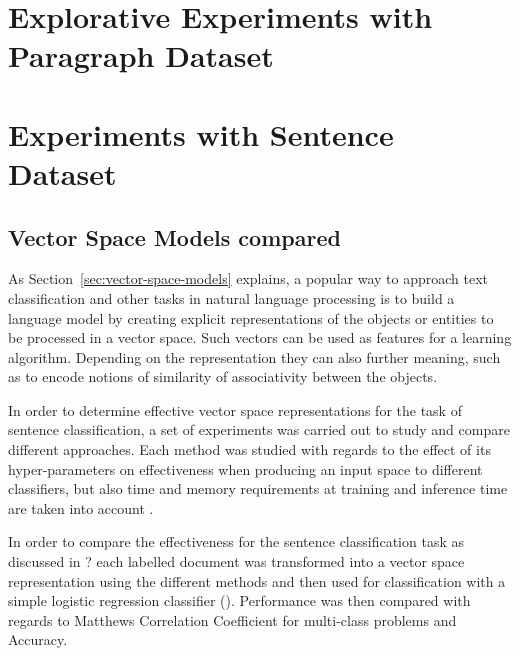 
\clearpage

\section{Explorative Experiments with Paragraph Dataset}

\section{Experiments with Sentence Dataset}

\subsection{Vector Space Models compared}



As Section~\ref{sec:vector-space-models} explains, a popular way to approach text classification and other tasks in natural language processing is to build a language model by creating explicit representations of the objects or entities to be processed in a vector space. Such vectors can be used as features for a learning algorithm. Depending on the representation they can also further meaning, such as to encode notions of similarity of associativity between the objects.

In order to determine effective vector space representations for the task of sentence classification, a set of experiments was carried out to study and compare different approaches. Each method was studied with regards to the effect of its hyper-parameters on effectiveness when producing an input space to different classifiers, but also time and memory requirements at training and inference time are taken into account .

In order to compare the effectiveness for the sentence classification task as discussed in ? each labelled document was transformed into a vector space representation using the different methods and then used for classification with a simple logistic regression classifier (). Performance was then compared with regards to Matthews Correlation Coefficient for multi-class problems  and Accuracy.

